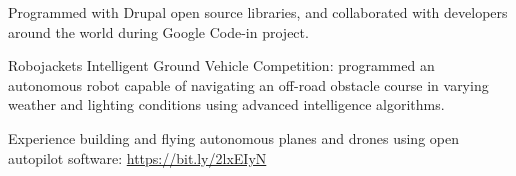 \begin{cventries}
{\begin{cvitems}
            \vspace{1mm}
        \item {Programmed with Drupal open source libraries, and collaborated with developers around the world during Google Code-in project.}
            \vspace{1mm}
        \item {Robojackets Intelligent Ground Vehicle Competition: programmed an autonomous robot capable of navigating an off-road obstacle course in varying weather and lighting conditions using advanced intelligence algorithms.}
            \vspace{1mm}
        \item {Experience building and flying autonomous planes and drones using open autopilot software: \href{https://bit.ly/2lxEIyN}{https://bit.ly/2lxEIyN}}
      \end{cvitems}
    }
\end{cventries}


